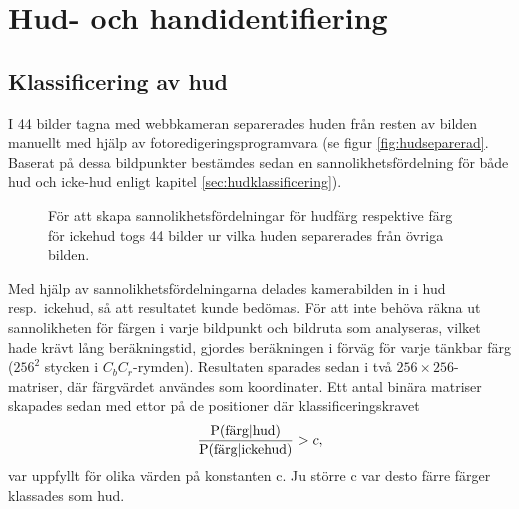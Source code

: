 \section{Hud- och handidentifiering}

\subsection{Klassificering av hud}\label{sec:metod:hud:klass}
I 44 bilder tagna med webbkameran separerades huden från resten av
bilden manuellt med hjälp av fotoredigeringsprogramvara (se figur
\vref{fig:hudseparerad}. Baserat på
dessa bildpunkter bestämdes sedan en sannolikhetsfördelning för både hud
och icke-hud enligt kapitel \ref{sec:hudklassificering}). 

\begin{figure}[tb]
	\centering 
	\caption{För att skapa sannolikhetsfördelningar för hudfärg
          respektive färg för ickehud togs 44 bilder ur vilka huden
          separerades från övriga bilden.}
	\label{fig:hudseparerad}
\end{figure}


Med hjälp av
sannolikhetsfördelningarna delades kamerabilden in i hud
resp.~ickehud, så att resultatet kunde bedömas. För att inte behöva
räkna ut sannolikheten för färgen i varje bildpunkt och bildruta
som analyseras,
vilket hade krävt lång beräkningstid, gjordes beräkningen
i förväg för varje tänkbar färg ($256^2$ stycken i
$C_bC_r$-rymden). Resultaten sparades
sedan i två $256\times256$-matriser, där färgvärdet användes som
koordinater. Ett antal binära matriser skapades sedan med ettor på de
positioner där klassificeringskravet 
\begin{equation*}
	\frac{\mathrm{P}(\textrm{färg}|\textrm{hud})}{\mathrm{P}(\textrm{färg}|\textrm{ickehud})} > c,
\end{equation*}
var uppfyllt för olika värden på konstanten c. Ju större c var desto färre
färger klassades som hud. 

